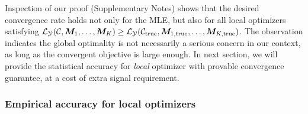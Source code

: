 \documentclass[12pt]{article}
\theoremstyle{definition}
\theoremstyle{definition}
\begin{document}
Inspection of our proof (Supplementary Notes) shows that the desired convergence rate holds not only for the MLE, but also for all local optimizers satisfying $\mathcal{L}_{\mathcal{Y}}(\mathcal{C}, \bm M_1,\ldots,\bm M_K)\geq \mathcal{L}_{\mathcal{Y}} (\mathcal{C}_{\textup{true}},\bm M_{1,\textup{true}},\ldots,\bm M_{K,\textup{true}})$. The observation indicates the global optimality is not necessarily a serious concern in our context, as long as the convergent objective is large enough. In next section, we will provide the statistical accuracy for \emph{local} optimizer with provable convergence guarantee, at a cost of extra signal requirement. 



\subsubsection{Empirical accuracy for local optimizers}\label{sec:local}
\end{document}
